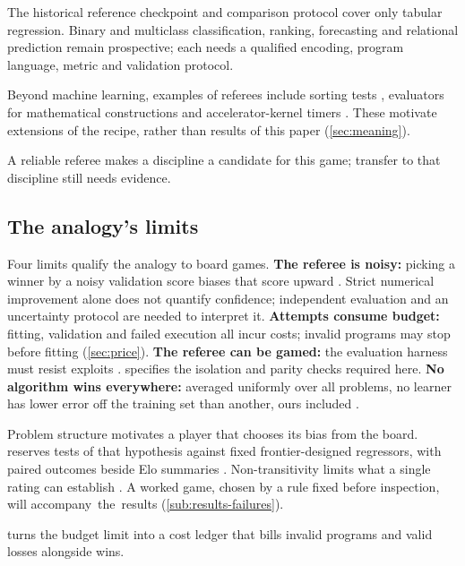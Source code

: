 The historical reference checkpoint and comparison protocol cover only
tabular regression. Binary and multiclass classification, ranking,
forecasting and relational prediction remain prospective; each needs a
qualified encoding, program language, metric and validation protocol.

Beyond machine learning, examples of referees include sorting tests
\citep{mankowitz2023alphadev}, evaluators for mathematical constructions
\citep{romeraparedes2024funsearch} and accelerator-kernel timers
\citep{novikov2025alphaevolve}. These motivate extensions of the recipe,
rather than results of this paper (\cref{sec:meaning}).

\begin{keyidea}
A reliable referee makes a discipline a candidate for this game; transfer
to that discipline still needs evidence.
\end{keyidea}

\subsection{The analogy's limits}\label{sub:game-played}

Four limits qualify the analogy to board games.
\textbf{The referee is noisy:} picking a
winner by a noisy validation score biases that score upward
\citep{cawley2010overfitting}. Strict numerical improvement alone does not
quantify confidence; independent evaluation and an uncertainty protocol are
needed to interpret it.
\textbf{Attempts consume budget:} fitting, validation and failed execution
all incur costs; invalid programs may stop before fitting
(\cref{sec:price}).
\textbf{The referee can be gamed:} the evaluation harness must resist exploits
\citep{metr2025rewardhacking}.  specifies the
isolation and parity checks required here.
\textbf{No algorithm wins everywhere:} averaged
uniformly over all problems, no learner has lower error off the training set
than another, ours included \citep{wolpert1996nfl}.

Problem structure motivates a player that chooses its bias from the board.
 reserves tests of that hypothesis against fixed
frontier-designed regressors, with paired outcomes beside Elo summaries
\citep{elo1978rating}. Non-transitivity limits what a single rating can establish
\citep{balduzzi2018reevaluating}. A worked game, chosen by a rule fixed
before inspection, will \mbox{accompany the results}
(\cref{sub:results-failures}).

 turns the budget limit into a cost ledger that bills invalid
programs and valid losses alongside wins.

